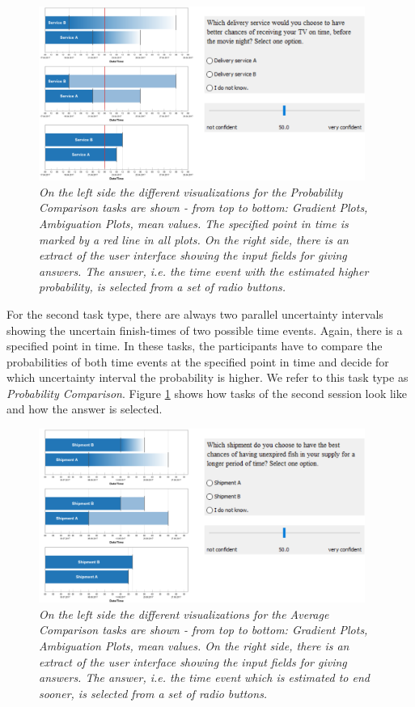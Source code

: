 \begin{figure}[H]
	\centering
	\includegraphics[width=0.95\textwidth]{figures/EvalBench_session2.png}
	\caption{\textit{On the left side the different visualizations for the Probability Comparison tasks are shown - from top to bottom: Gradient Plots, Ambiguation Plots, mean values. The specified point in time is marked by a red line in all plots. On the right side, there is an extract of the user interface showing the input fields for giving answers. The answer, i.e. the time event with the estimated higher probability, is selected from a set of radio buttons.}}
	\label{fig:EvalBench_session2}
\end{figure}

For the second task type, there are always two parallel uncertainty intervals showing the uncertain finish-times of two possible time events. Again, there is a specified point in time. In these tasks, the participants have to compare the probabilities of both time events at the specified point in time and decide for which uncertainty interval the probability is higher. We refer to this task type as \textit{Probability Comparison}. Figure \ref{fig:EvalBench_session2} shows how tasks of the second session look like and how the answer is selected. \par \medskip

\begin{figure}[H]
	\centering
	\includegraphics[width=0.95\textwidth]{figures/EvalBench_session3.png}
	\caption{\textit{On the left side the different visualizations for the Average Comparison tasks are shown - from top to bottom: Gradient Plots, Ambiguation Plots, mean values. On the right side, there is an extract of the user interface showing the input fields for giving answers. The answer, i.e. the time event which is estimated to end sooner, is selected from a set of radio buttons.}}
	\label{fig:EvalBench_session3}
\end{figure}

